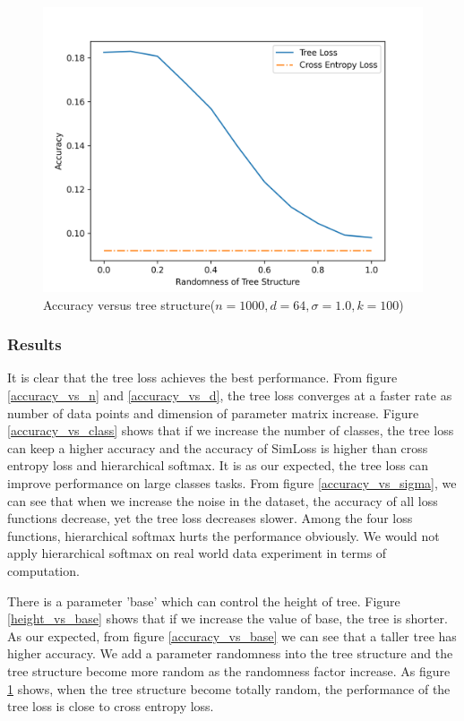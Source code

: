 \documentclass[twoside]{article}
\theoremstyle{definition}
\begin{document}
\begin{figure}[h]
\vspace{.3in}
\includegraphics[width=\linewidth]{fig/new_img/loss_vs_structure.png}
\vspace{.3in}
\caption{\small Accuracy versus tree structure($n=1000, d=64, \sigma=1.0, k=100$)}
\label{accuracy_vs_structure}
\end{figure}


\subsubsection{Results}
It is clear that the tree loss achieves the best performance. 
From figure \ref{accuracy_vs_n} and \ref{accuracy_vs_d}, the tree loss converges at a faster rate as number of data points and dimension of parameter matrix increase.
Figure \ref{accuracy_vs_class} shows that if we increase the number of classes, the tree loss can keep a higher accuracy and the accuracy of SimLoss is higher than cross entropy loss and hierarchical softmax.
It is as our expected, the tree loss can improve performance on large classes tasks.
From figure \ref{accuracy_vs_sigma}, we can see that when we increase the noise in the dataset, the accuracy of all loss functions decrease, yet the tree loss decreases slower.
Among the four loss functions, hierarchical softmax hurts the performance obviously. 
We would not apply hierarchical softmax on real world data experiment in terms of computation.

There is a parameter 'base' which can control the height of tree.
Figure \ref{height_vs_base} shows that if we increase the value of base, the tree is shorter.
As our expected, from figure \ref{accuracy_vs_base} we can see that a taller tree has higher accuracy. 
We add a parameter randomness into the tree structure and the tree structure become more random as the randomness factor increase.
As figure \ref{accuracy_vs_structure} shows, when the tree structure become totally random, the performance of the tree loss is close to cross entropy loss.
\end{document}

